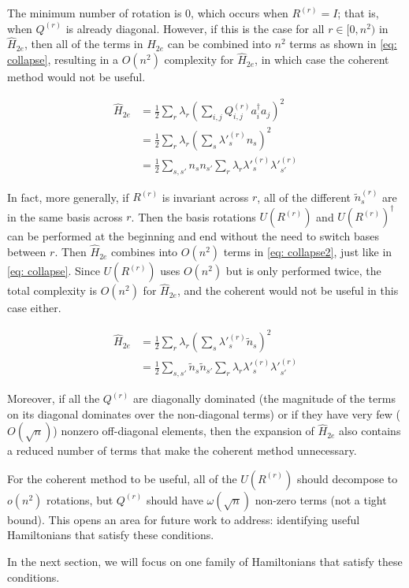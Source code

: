 The minimum number of rotation is $0$, which occurs when $R^{(r)} = I$; that is, when $Q^{(r)}$ is already diagonal. However, if this is the case for all $r \in [0, n^2)$ in $\hat{H}_{2e}$, then all of the terms in $\hat{H}_{2e}$ can be combined into $n^2$ terms as shown in \eqref{eq: collapse}, resulting in a $O(n^2)$ complexity for $\hat{H}_{2e}$, in which case the coherent method would not be useful.

\begin{equation}
    \begin{split}
        \hat{H}_{2e} &= \frac{1}{2}\sum_r\lambda_r\left(\sum_{i,j} Q^{(r)}_{i, j}a^\dag_ia_j\right)^2 \\
        &= \frac{1}{2}\sum_r\lambda_r(\sum_{s} \lambda'^{(r)}_sn_s)^2 \\
        &= \frac{1}{2}\sum_{s, s'} n_sn_{s'}\sum_r\lambda_r\lambda'^{(r)}_s\lambda'^{(r)}_{s'}
    \end{split}
    \label{eq: collapse}
\end{equation}

In fact, more generally, if $R^{(r)}$ is invariant across $r$, all of the different $\tilde{n}^{(r)}_s$ are in the same basis across $r$. Then the basis rotations $U(R^{(r)})$ and $U(R^{(r)})^\dag$ can be performed at the beginning and end without the need to switch bases between $r$. Then $\hat{H}_{2e}$ combines into $O(n^2)$ terms in \eqref{eq: collapse2}, just like in \eqref{eq: collapse}. Since $U(R^{(r)})$ uses $O(n^2)$ but is only performed twice, the total complexity is $O(n^2)$ for $\hat{H}_{2e}$, and the coherent would not be useful in this case either.

\begin{equation}
    \begin{split}
        \hat{H}_{2e} &= \frac{1}{2}\sum_r\lambda_r\left(\sum_s \lambda'^{(r)}_s \tilde{n}_s\right)^2 \\
        &= \frac{1}{2}\sum_{s, s'} \tilde{n}_s\tilde{n}_{s'}\sum_r\lambda_r\lambda'^{(r)}_s\lambda'^{(r)}_{s'}
    \end{split}
    \label{eq: collapse2}
\end{equation}

Moreover, if all the $Q^{(r)}$ are diagonally dominated (the magnitude of the terms on its diagonal dominates over the non-diagonal terms) or if they have very few ($O(\sqrt{n})$) nonzero off-diagonal elements, then the expansion of $\hat{H}_{2e}$ also contains a reduced number of terms that make the coherent method unnecessary.

For the coherent method to be useful, all of the $U(R^{(r)})$ should decompose to $o(n^2)$ rotations, but $Q^{(r)}$ should have $\omega(\sqrt{n})$ non-zero terms (not a tight bound). This opens an area for future work to address: identifying useful Hamiltonians that satisfy these conditions.

In the next section, we will focus on one family of Hamiltonians that satisfy these conditions.





